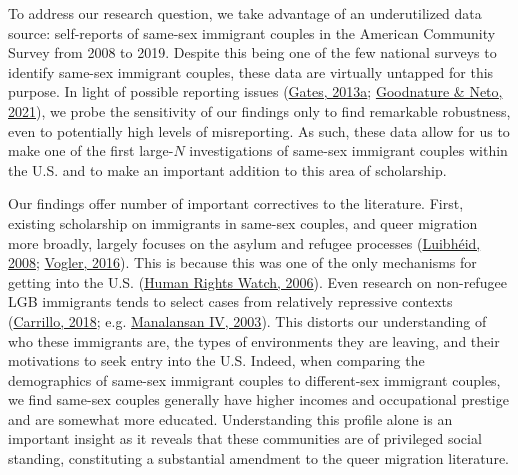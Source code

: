 \documentclass[
  12pt,
]{article}
\begin{document}
To address our research question, we take advantage of an underutilized data source: self-reports of same-sex immigrant couples in the American Community Survey from 2008 to 2019. Despite this being one of the few national surveys to identify same-sex immigrant couples, these data are virtually untapped for this purpose. In light of possible reporting issues (\protect\hyperlink{ref-gates_2013}{Gates, 2013a}; \protect\hyperlink{ref-goodnature_2021}{Goodnature \& Neto, 2021}), we probe the sensitivity of our findings only to find remarkable robustness, even to potentially high levels of misreporting. As such, these data allow for us to make one of the first large-\(N\) investigations of same-sex immigrant couples within the U.S. and to make an important addition to this area of scholarship.

Our findings offer number of important correctives to the literature. First, existing scholarship on immigrants in same-sex couples, and queer migration more broadly, largely focuses on the asylum and refugee processes (\protect\hyperlink{ref-luibheid_2008}{Luibhéid, 2008}; \protect\hyperlink{ref-vogler_2016}{Vogler, 2016}). This is because this was one of the only mechanisms for getting into the U.S. (\protect\hyperlink{ref-humanrightswatch_2006}{Human Rights Watch, 2006}). Even research on non-refugee LGB immigrants tends to select cases from relatively repressive contexts (\protect\hyperlink{ref-carrillo_2018}{Carrillo, 2018}; e.g. \protect\hyperlink{ref-manalansaniv_2003}{Manalansan IV, 2003}). This distorts our understanding of who these immigrants are, the types of environments they are leaving, and their motivations to seek entry into the U.S. Indeed, when comparing the demographics of same-sex immigrant couples to different-sex immigrant couples, we find same-sex couples generally have higher incomes and occupational prestige and are somewhat more educated. Understanding this profile alone is an important insight as it reveals that these communities are of privileged social standing, constituting a substantial amendment to the queer migration literature.
\end{document}
